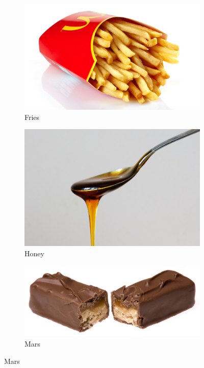 \documentclass[a4paper,doc,natbib]{apa6}
\begin{document}
\begin{figure}[h!]
\begin{subfigure}[b]{0.32\textwidth}
        \end{subfigure}
        \begin{subfigure}[b]{0.32\textwidth}
            \caption{Fries}
            \includegraphics[width=0.95\linewidth]{Images/fries.png}
        \end{subfigure}
        \begin{subfigure}[b]{0.32\textwidth}
            \caption{Honey}
            \includegraphics[width=0.95\linewidth]{Images/honey.jpg}
        \end{subfigure}
        \begin{subfigure}[b]{0.32\textwidth}
            \caption{Mars}
            \includegraphics[width=0.95\linewidth]{Images/mars.jpg}

\end{subfigure}
\end{figure}
\end{document}

